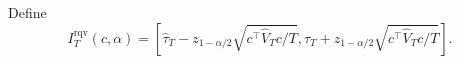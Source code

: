 Define
\[
 I_T^{\mathrm{rqv}}(c,\alpha)=\left[\widehat\tau_T-z_{1-\alpha/2}\sqrt{c^\top\widehat V_Tc/T},
 \widehat\tau_T+z_{1-\alpha/2}\sqrt{c^\top\widehat V_Tc/T}\right].
\]